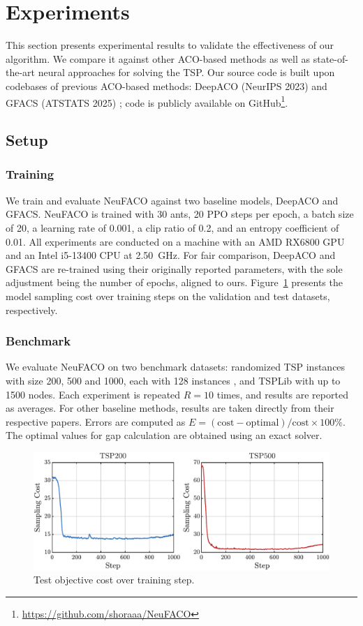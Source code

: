 \documentclass[a4paper,conference]{IEEEtran}
\begin{document}
\section{Experiments}
\hypersetup{citecolor=blue}
This section presents experimental results to validate the effectiveness of our algorithm. We compare it against other ACO-based methods as well as state-of-the-art neural approaches for solving the TSP. Our source code is built upon codebases of previous ACO-based methods: DeepACO (NeurIPS 2023) \cite{DeepACO} and GFACS (ATSTATS 2025) \cite{GFACS}; code is publicly available on GitHub\footnote{\url{https://github.com/shoraaa/NeuFACO}}.

\subsection{Setup}

\subsubsection{Training}
We train and evaluate NeuFACO against two baseline models, DeepACO and GFACS. NeuFACO is trained with 30 ants, 20 PPO steps per epoch, a batch size of 20, a learning rate of 0.001, a clip ratio of 0.2, and an entropy coefficient of 0.01. All experiments are conducted on a machine with an AMD RX6800 GPU and an Intel i5-13400 CPU at \SI{2.50}{GHz}. For fair comparison, DeepACO and GFACS are re-trained using their originally reported parameters, with the sole adjustment being the number of epochs, aligned to ours. Figure~\ref{fig:val} presents the model sampling cost over training steps on the validation and test datasets, respectively.

\subsubsection{Benchmark}
We evaluate NeuFACO on two benchmark datasets: randomized TSP instances with size 200, 500 and 1000, each with 128 instances \cite{DeepACO}, and TSPLib \cite{tsplib} with up to 1500 nodes. Each experiment is repeated $R=10$ times, and results are reported as averages. For other baseline methods, results are taken directly from their respective papers. Errors are computed as $E=(\text{cost}-\text{optimal}) / \text{cost}\times100\%$. The optimal values for gap calculation are obtained using an exact solver.


\begin{figure}[htbp]
  \centering
  \includegraphics[width=\linewidth]{TSP200_TSP500_Test.pdf}
  \caption{Test objective cost over training step.}
  \label{fig:val}
\end{figure}
\end{document}
